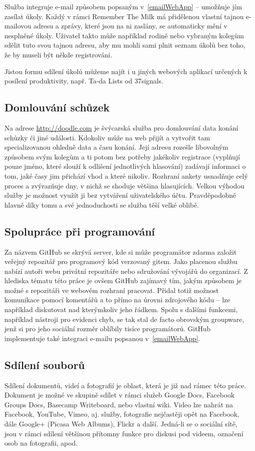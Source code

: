 \documentclass[12pt,oneside,final]{fithesis2}
\begin{document}
Služba integruje e-mail způsobem popsaným v~\ref{emailWebApp} -- umožňuje jím zasílat úkoly. Každý v rámci Remember The Milk má přidělenou vlastní tajnou e-mailovou adresu a zprávy, které jsou na ni zaslány, se automaticky mění v nesplněné úkoly. Uživatel takto může například rodině nebo vybraným kolegům sdělit tuto svou tajnou adresu, aby mu mohli sami plnit seznam úkolů bez toho, že by museli být někde registrováni.

Jistou formu sdílení úkolů můžeme najít i u jiných webových aplikací určených k posílení produktivity, např. Ta-da Lists od 37signals.

\subsection{Domlouvání schůzek}
Na adrese \url{http://doodle.com} je švýcarská služba pro domlouvání data konání schůzky či jiné události. Kdokoliv může na web přijít a vytvořit tam specializovanou  ohledně data a času konání. Její adresu rozešle libovolným způsobem svým kolegům a ti potom bez potřeby jakékoliv registrace (vyplňují pouze jméno, které slouží k odlišení jednotlivých hlasování) zadávají informaci o tom, jaké časy jim přichází vhod a které nikoliv. Rozhraní ankety usnadňuje celý proces a zvýrazňuje dny, v nichž se shoduje většina hlasujících. Velkou výhodou služby je možnost využít ji bez vytváření uživatelského účtu. Pravděpodobně hlavně díky tomu a své jednoduchosti se služba těší velké oblibě.

\subsection{Spolupráce při programování}
Za názvem GitHub se skrývá server, kde si může programátor zdarma založit veřejný repozitář pro programový kód verzovaný gitem. Jako placenou službu nabízí autoři webu privátní repozitáře nebo sdružování vývojářů do organizací. Z hlediska tématu této práce je ovšem GitHub zajímavý tím, jakým způsobem je možné s repozitáři ve webovém rozhraní pracovat. Přidal totiž možnost komunikace pomocí komentářů a to přímo na úrovni zdrojového kódu -- lze například diskutovat nad kterýmkoliv jeho řádkem. Spolu s dalšími funkcemi, například nástroji pro evidenci chyb, se tak stal de facto obrovským groupware, jenž si pro jeho sociální rozměr oblíbily tisíce programátorů. GitHub implementuje také integraci e-mailu popsanou v~\ref{emailWebApp}.

\subsection{Sdílení souborů}
Sdílení dokumentů, videí a fotografií je oblast, která je již nad rámec této práce. Dokument je možné ve skupině sdílet v rámci služeb Google Docs, Facebook Groups Docs, Basecamp Writeboard, nebo vlastní wiki. Video lze nahrát na Facebook, YouTube, Vimeo, aj. služby, fotografie nejčastěji opět na Facebook, dále Google+ (Picasa Web Albums), Flickr a další. Jedná-li se o sociální sítě, jsou v rámci sdílení většinou přítomny funkce pro diskusi pod videem, označení osob na fotografii, apod.
\end{document}
